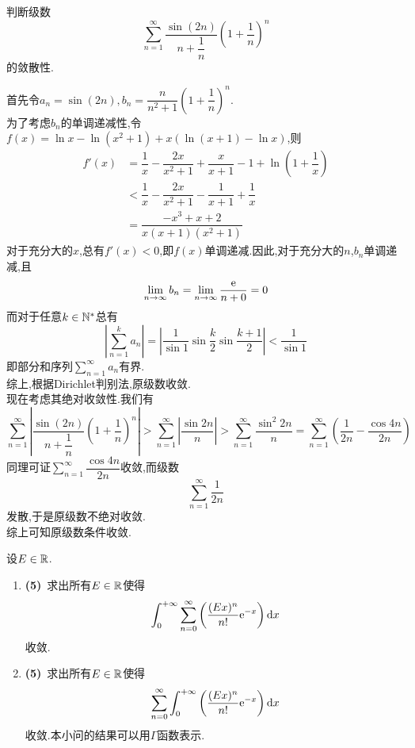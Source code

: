\documentclass{ctexart}
\begin{document}
\begin{problem}[4.(10\songti{分})]
    判断级数
    \[\sum_{n=1}^{\infty}\dfrac{\sin(2n)}{n+\dfrac1n}\left(1+\dfrac1n\right)^n\]
    的敛散性.
        
\end{problem}
\begin{solution}
    首先令$a_n=\sin(2n),b_n=\dfrac{n}{n^2+1}\left(1+\dfrac1n\right)^n$.\\
    为了考虑$b_n$的单调递减性,令$f(x)=\ln x-\ln\left(x^2+1\right)+x\left(\ln(x+1)-\ln x\right)$,则
    \[\begin{aligned}
        f'(x)
        &= \dfrac{1}{x}-\dfrac{2x}{x^2+1}+\dfrac{x}{x+1}-1+\ln\left(1+\dfrac1x\right) \\
        &< \dfrac{1}{x}-\dfrac{2x}{x^2+1}-\dfrac{1}{x+1}+\dfrac{1}{x} \\
        &= \dfrac{-x^3+x+2}{x(x+1)\left(x^2+1\right)}
    \end{aligned}\]
    对于充分大的$x$,总有$f'(x)<0$,即$f(x)$单调递减.因此,对于充分大的$n$,$b_n$单调递减,且
    \[\lim_{n\to\infty}b_n=\lim_{n\to\infty}\dfrac{\mathrm{e}}{n+0}=0\]
    而对于任意$k\in\mathbb{N}^*$总有
    \[\left|\sum_{n=1}^{k}a_n\right|=\left|\dfrac{1}{\sin 1}\sin\dfrac{k}{2}\sin\dfrac{k+1}{2}\right|<\dfrac{1}{\sin 1}\]
    即部分和序列$\displaystyle\sum_{n=1}^{\infty}a_n$有界.\\
    综上,根据Dirichlet判别法,原级数收敛.\\
    现在考虑其绝对收敛性.我们有
    \[\sum_{n=1}^{\infty}\left|\dfrac{\sin(2n)}{n+\dfrac1n}\left(1+\dfrac1n\right)^n\right|
    >\sum_{n=1}^{\infty}\left|\dfrac{\sin 2n}{n}\right|
    >\sum_{n=1}^{\infty}\dfrac{\sin^2 2n}{n}
    =\sum_{n=1}^{\infty}\left(\dfrac{1}{2n}-\dfrac{\cos 4n}{2n}\right)\]
    同理可证$\displaystyle\sum_{n=1}^{\infty}\dfrac{\cos 4n}{2n}$收敛,而级数
    \[\sum_{n=1}^{\infty}\dfrac{1}{2n}\]
    发散,于是原级数不绝对收敛.\\
    综上可知原级数条件收敛.

\end{solution}
\begin{problem}[5.(10\songti{分})]
    设$E\in\mathbb{R}$.
    \begin{enumerate}[label=\tbf{(\arabic*)},topsep=0pt,parsep=0pt,itemsep=0pt,partopsep=0pt]
        \item \textbf{(5)}\ 求出所有$E\in\mathbb{R}$使得
            \[\int_0^{+\infty}\sum_{n=0}^{\infty}\left(\dfrac{(Ex)^n}{n!}\mathrm{e}^{-x}\right)\mathrm{d} x\]
            收敛.
        \item \textbf{(5)}\ 求出所有$E\in\mathbb{R}$使得
            \[\sum_{n=0}^{\infty}\int_0^{+\infty}\left(\dfrac{(Ex)^n}{n!}\mathrm{e}^{-x}\right)\mathrm{d} x\]
            收敛.本小问的结果可以用$\Gamma$函数表示.
    \end{enumerate}
\end{problem}
\end{document}

